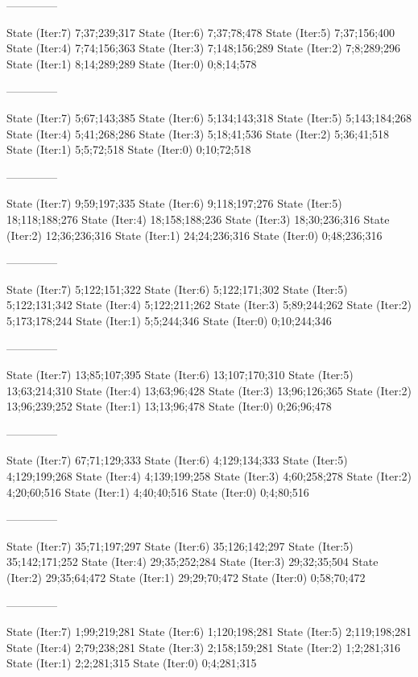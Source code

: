 \documentclass[a4paper,10pt,ngerman]{scrartcl}
\begin{document}
\begin{lstcs}
--------------

State (Iter:7) {7;37;239;317}
State (Iter:6) {7;37;78;478}
State (Iter:5) {7;37;156;400}
State (Iter:4) {7;74;156;363}
State (Iter:3) {7;148;156;289}
State (Iter:2) {7;8;289;296}
State (Iter:1) {8;14;289;289}
State (Iter:0) {0;8;14;578}

--------------

State (Iter:7) {5;67;143;385}
State (Iter:6) {5;134;143;318}
State (Iter:5) {5;143;184;268}
State (Iter:4) {5;41;268;286}
State (Iter:3) {5;18;41;536}
State (Iter:2) {5;36;41;518}
State (Iter:1) {5;5;72;518}
State (Iter:0) {0;10;72;518}

--------------

State (Iter:7) {9;59;197;335}
State (Iter:6) {9;118;197;276}
State (Iter:5) {18;118;188;276}
State (Iter:4) {18;158;188;236}
State (Iter:3) {18;30;236;316}
State (Iter:2) {12;36;236;316}
State (Iter:1) {24;24;236;316}
State (Iter:0) {0;48;236;316}

--------------

State (Iter:7) {5;122;151;322}
State (Iter:6) {5;122;171;302}
State (Iter:5) {5;122;131;342}
State (Iter:4) {5;122;211;262}
State (Iter:3) {5;89;244;262}
State (Iter:2) {5;173;178;244}
State (Iter:1) {5;5;244;346}
State (Iter:0) {0;10;244;346}

--------------

State (Iter:7) {13;85;107;395}
State (Iter:6) {13;107;170;310}
State (Iter:5) {13;63;214;310}
State (Iter:4) {13;63;96;428}
State (Iter:3) {13;96;126;365}
State (Iter:2) {13;96;239;252}
State (Iter:1) {13;13;96;478}
State (Iter:0) {0;26;96;478}

--------------

State (Iter:7) {67;71;129;333}
State (Iter:6) {4;129;134;333}
State (Iter:5) {4;129;199;268}
State (Iter:4) {4;139;199;258}
State (Iter:3) {4;60;258;278}
State (Iter:2) {4;20;60;516}
State (Iter:1) {4;40;40;516}
State (Iter:0) {0;4;80;516}

--------------

State (Iter:7) {35;71;197;297}
State (Iter:6) {35;126;142;297}
State (Iter:5) {35;142;171;252}
State (Iter:4) {29;35;252;284}
State (Iter:3) {29;32;35;504}
State (Iter:2) {29;35;64;472}
State (Iter:1) {29;29;70;472}
State (Iter:0) {0;58;70;472}

--------------

State (Iter:7) {1;99;219;281}
State (Iter:6) {1;120;198;281}
State (Iter:5) {2;119;198;281}
State (Iter:4) {2;79;238;281}
State (Iter:3) {2;158;159;281}
State (Iter:2) {1;2;281;316}
State (Iter:1) {2;2;281;315}
State (Iter:0) {0;4;281;315}


\end{lstcs}
\end{document}
